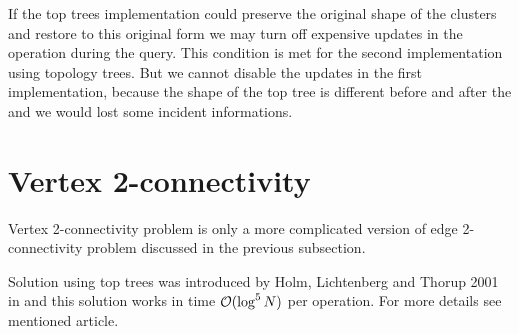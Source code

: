 If the top trees implementation could preserve the original shape of the
clusters and restore to this original form we may turn off expensive updates
in the \Join{} operation during the query. This condition is met for the second
implementation using topology trees. But we cannot disable the updates in the
first implementation, because the shape of the top tree is different before and
after the \Expose{} and we would lost some incident informations.


\section{Vertex 2-connectivity}

Vertex 2-connectivity problem is only a more complicated version of edge
2-connectivity problem discussed in the previous subsection.

Solution using top trees was introduced by Holm, Lichtenberg and Thorup 2001 in
\cite{PolylogarithmicAlgorithmsForConnectivity} and this solution works in time
${\cal O}(\log^5 N)$ per operation. For more details see mentioned article.
